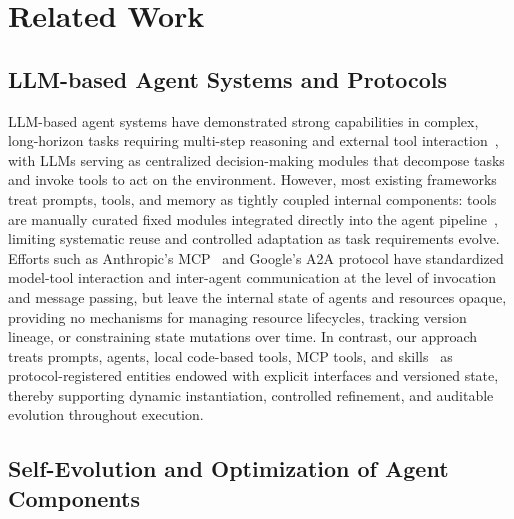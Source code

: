 \documentclass{article}
\theoremstyle{plain}
\theoremstyle{definition}
\theoremstyle{remark}
\begin{document}
\vspace{-0.2cm}
\section{Related Work}
\vspace{-0.2cm}

\subsection{LLM-based Agent Systems and Protocols}
LLM-based agent systems have demonstrated strong capabilities in complex, long-horizon tasks requiring multi-step reasoning and external tool interaction~\cite{rein2024gpqa, mialon2023gaia, yao2022react, wei2022chain, schick2023toolformer}, with LLMs serving as centralized decision-making modules that decompose tasks and invoke tools to act on the environment. However, most existing frameworks treat prompts, tools, and memory as tightly coupled internal components: tools are manually curated fixed modules integrated directly into the agent pipeline~\cite{qin2023toolllm, schick2023toolformer, chen2021evaluating}, limiting systematic reuse and controlled adaptation as task requirements evolve. Efforts such as Anthropic's MCP~\cite{anthropic2025} and Google's A2A protocol have standardized model-tool interaction and inter-agent communication at the level of invocation and message passing, but leave the internal state of agents and resources opaque, providing no mechanisms for managing resource lifecycles, tracking version lineage, or constraining state mutations over time. In contrast, our approach treats prompts, agents, local code-based tools, MCP tools, and skills~\cite{anthropic2025agentskills} as protocol-registered entities endowed with explicit interfaces and versioned state, thereby supporting dynamic instantiation, controlled refinement, and auditable evolution throughout execution.

\vspace{-0.2cm}
\subsection{Self-Evolution and Optimization of Agent Components}
\vspace{-0.2cm}
\end{document}
